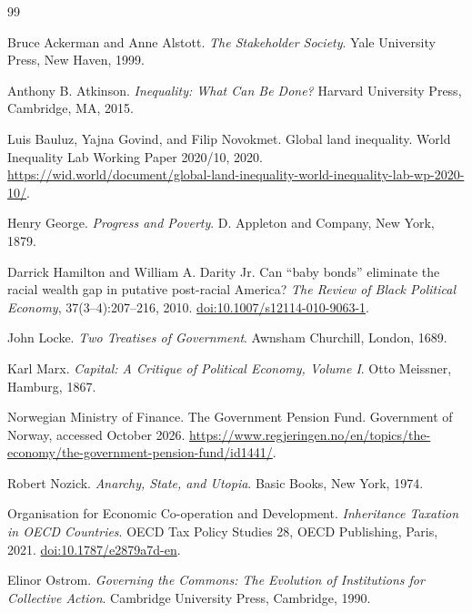 \documentclass[11pt]{article}
\begin{document}
\begin{thebibliography}{99}
\raggedright

Bruce Ackerman and Anne Alstott.
\newblock \emph{The Stakeholder Society}.
\newblock Yale University Press, New Haven, 1999.

Anthony B. Atkinson.
\newblock \emph{Inequality: What Can Be Done?}
\newblock Harvard University Press, Cambridge, MA, 2015.

Luis Bauluz, Yajna Govind, and Filip Novokmet.
\newblock Global land inequality.
\newblock World Inequality Lab Working Paper 2020/10, 2020.
\newblock \url{https://wid.world/document/global-land-inequality-world-inequality-lab-wp-2020-10/}.

Henry George.
\newblock \emph{Progress and Poverty}.
\newblock D. Appleton and Company, New York, 1879.

Darrick Hamilton and William A. Darity Jr.
\newblock Can ``baby bonds'' eliminate the racial wealth gap in putative
post-racial America?
\newblock \emph{The Review of Black Political Economy}, 37(3--4):207--216, 2010.
\newblock \href{https://doi.org/10.1007/s12114-010-9063-1}{doi:10.1007/s12114-010-9063-1}.

John Locke.
\newblock \emph{Two Treatises of Government}.
\newblock Awnsham Churchill, London, 1689.

Karl Marx.
\newblock \emph{Capital: A Critique of Political Economy, Volume I}.
\newblock Otto Meissner, Hamburg, 1867.

Norwegian Ministry of Finance.
\newblock The Government Pension Fund.
\newblock Government of Norway, accessed October 2026.
\newblock \url{https://www.regjeringen.no/en/topics/the-economy/the-government-pension-fund/id1441/}.

Robert Nozick.
\newblock \emph{Anarchy, State, and Utopia}.
\newblock Basic Books, New York, 1974.

Organisation for Economic Co-operation and Development.
\newblock \emph{Inheritance Taxation in OECD Countries}.
\newblock OECD Tax Policy Studies 28, OECD Publishing, Paris, 2021.
\newblock \href{https://doi.org/10.1787/e2879a7d-en}{doi:10.1787/e2879a7d-en}.

Elinor Ostrom.
\newblock \emph{Governing the Commons: The Evolution of Institutions for Collective
Action}.
\newblock Cambridge University Press, Cambridge, 1990.


\end{thebibliography}
\end{document}

